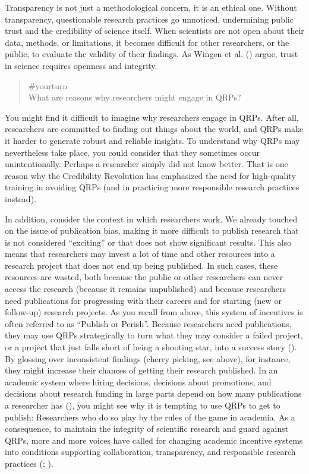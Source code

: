\documentclass[
  letterpaper,
]{book}
\begin{document}
Transparency is not just a methodological concern, it is an ethical one.
Without transparency, questionable research practices go unnoticed,
undermining public trust and the credibility of science itself. When
scientists are not open about their data, methods, or limitations, it
becomes difficult for other researchers, or the public, to evaluate the
validity of their findings. As Wingen et al.
() argue, trust in science requires
openness and integrity.

\begin{quote}
{\#yourturn}\\
What are reasons why researchers might engage in QRPs?
\end{quote}

You might find it difficult to imagine why researchers engage in QRPs.
After all, researchers are committed to finding out things about the
world, and QRPs make it harder to generate robust and reliable insights.
To understand why QRPs may nevertheless take place, you could consider
that they sometimes occur unintentionally. Perhaps a researcher simply
did not know better. That is one reason why the Credibility Revolution
has emphasized the need for high-quality training in avoiding QRPs (and
in practicing more responsible research practices instead).

In addition, consider the context in which researchers work. We already
touched on the issue of publication bias, making it more difficult to
publish research that is not considered ``exciting'' or that does not
show significant results. This also means that researchers may invest a
lot of time and other resources into a research project that does not
end up being published. In such cases, these resources are wasted, both
because the public or other researchers can never access the research
(because it remains unpublished) and because researchers need
publications for progressing with their careers and for starting (new or
follow-up) research projects. As you recall from above, this system of
incentives is often referred to as ``Publish or Perish''. Because
researchers need publications, they may use QRPs strategically to turn
what they may consider a failed project, or a project that just falls
short of being a shooting star, into a success story
(). By glossing over
inconsistent findings (cherry picking, see above), for instance, they
might increase their chances of getting their research published. In an
academic system where hiring decisions, decisions about promotions, and
decisions about research funding in large parts depend on how many
publications a researcher has
(), you
might see why it is tempting to use QRPs to get to publish: Researchers
who do so play by the rules of the game in academia. As a consequence,
to maintain the integrity of scientific research and guard against QRPs,
more and more voices have called for changing academic incentive systems
into conditions supporting collaboration, transparency, and responsible
research practices (; ).
\end{document}
